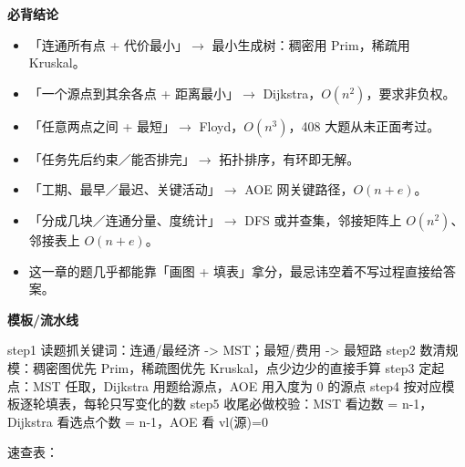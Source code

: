 \documentclass[10pt,a4paper]{ctexart}
\begin{document}




\textbf{必背结论}

\begin{itemize}

\item 「连通所有点 + 代价最小」$\to$ 最小生成树：稠密用 Prim，稀疏用 Kruskal。

\item 「一个源点到其余各点 + 距离最小」$\to$ Dijkstra，$O(n^2)$，要求非负权。

\item 「任意两点之间 + 最短」$\to$ Floyd，$O(n^3)$，408 大题从未正面考过。

\item 「任务先后约束／能否排完」$\to$ 拓扑排序，有环即无解。

\item 「工期、最早／最迟、关键活动」$\to$ AOE 网关键路径，$O(n+e)$。

\item 「分成几块／连通分量、度统计」$\to$ DFS 或并查集，邻接矩阵上 $O(n^2)$、邻接表上 $O(n+e)$。

\item 这一章的题几乎都能靠「画图 + 填表」拿分，最忌讳空着不写过程直接给答案。

\end{itemize}


\textbf{模板/流水线}

\begin{codebox}
step1  读题抓关键词：连通/最经济 -> MST；最短/费用 -> 最短路
step2  数清规模：稠密图优先 Prim，稀疏图优先 Kruskal，点少边少的直接手算
step3  定起点：MST 任取，Dijkstra 用题给源点，AOE 用入度为 0 的源点
step4  按对应模板逐轮填表，每轮只写变化的数
step5  收尾必做校验：MST 看边数 = n-1，Dijkstra 看选点个数 = n-1，AOE 看 vl(源)=0
\end{codebox}

速查表：
\end{document}
